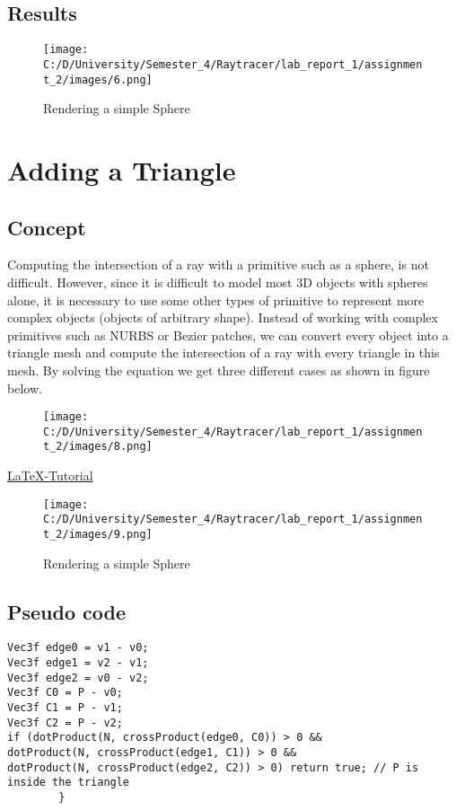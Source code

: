 \documentclass{article}
\begin{document}
\subsection{Results}
\begin{figure}[H]
		\begin{center}
	\texttt{[image: C:/D/University/Semester\_4/Raytracer/lab\_report\_1/assignment\_2/images/6.png]}
	
	\caption{Rendering a simple Sphere}
	\label{fig:boat1}
		\end{center}
\end{figure}



\section{Adding a Triangle}
\subsection{Concept}
Computing the intersection of a ray with a primitive such as a sphere, is not difficult. However, since it is difficult to model most 3D objects with spheres alone, it is necessary to use some other types of primitive to represent more complex objects (objects of arbitrary shape).
Instead of working with complex primitives such as NURBS or Bezier patches, we can convert every object into a triangle mesh and compute the intersection of a ray with every triangle in this mesh. 
By solving the equation we get three different cases as shown in figure below.
\begin{figure}[H]
	
	\texttt{[image: C:/D/University/Semester\_4/Raytracer/lab\_report\_1/assignment\_2/images/8.png]}
	\label{fig:boat1}
\end{figure}
\href{https://en.wikipedia.org/wiki/Line%E2%80%93sphere_intersection}{LaTeX-Tutorial}
	
		\begin{figure}[H]
		\begin{center}
			\texttt{[image: C:/D/University/Semester\_4/Raytracer/lab\_report\_1/assignment\_2/images/9.png]}
			
			\caption{Rendering a simple Sphere}
			\label{fig:boat1}
		\end{center}
	\end{figure}
	\subsection{Pseudo code}
	\begin{lstlisting}
Vec3f edge0 = v1 - v0; 
Vec3f edge1 = v2 - v1; 
Vec3f edge2 = v0 - v2; 
Vec3f C0 = P - v0; 
Vec3f C1 = P - v1; 
Vec3f C2 = P - v2; 
if (dotProduct(N, crossProduct(edge0, C0)) > 0 && 
dotProduct(N, crossProduct(edge1, C1)) > 0 && 
dotProduct(N, crossProduct(edge2, C2)) > 0) return true; // P is inside the triangle 
		}
	\end{lstlisting}
	
\end{document}
